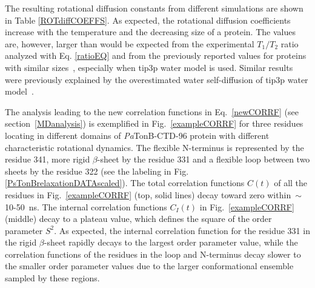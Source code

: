 \documentclass[journal=jpcbfk,manuscript=article]{achemso}
\begin{document}
The resulting rotational diffusion constants from different simulations are
shown in Table \ref{ROTdiffCOEFFS}.
As expected, the rotational diffusion coefficients
increase with the temperature and the decreasing size of a protein.
The values are, however, larger than would be  
expected from the experimental $T_1/T_2$ ratio analyzed with Eq. \ref{ratioEQ}
and from the previously reported values for proteins with similar
sizes~\cite{krishnan98}, especially when tip3p water model is used.
Similar results were previously explained by the overestimated water
self-diffusion of tip3p water model~\cite{wong08}.

The analysis leading to the new correlation functions in Eq.~\ref{newCORRF}
(see section~\ref{MDanalysis}) is exemplified in
Fig.~\ref{exampleCORRF} for three residues locating in different domains of {\it Pa}TonB-CTD-96
protein with different characteristic rotational dynamics.
The flexible N-terminus is represented by the residue 341,
more rigid $\beta$-sheet by the residue 331 and a
flexible loop between two sheets by the residue 322
(see the labeling in Fig. \ref{PsTonBrelaxationDATAscaled}). 
The total correlation functions $C(t)$
of all the residues in Fig.~\ref{exampleCORRF}  (top, solid lines) 
decay toward zero within~$\sim$10-50~ns.
The internal correlation functions $C_I(t)$ in Fig.~\ref{exampleCORRF} (middle)
decay to a plateau value, which defines the square of the order parameter $S^2$.
As expected, the internal correlation function for the residue 331 in the
rigid $\beta$-sheet rapidly decays to the largest order parameter value,
while the correlation functions of the residues in the loop and N-terminus 
decay slower to the smaller order parameter values due to the larger conformational ensemble
sampled by these regions.
\end{document}
